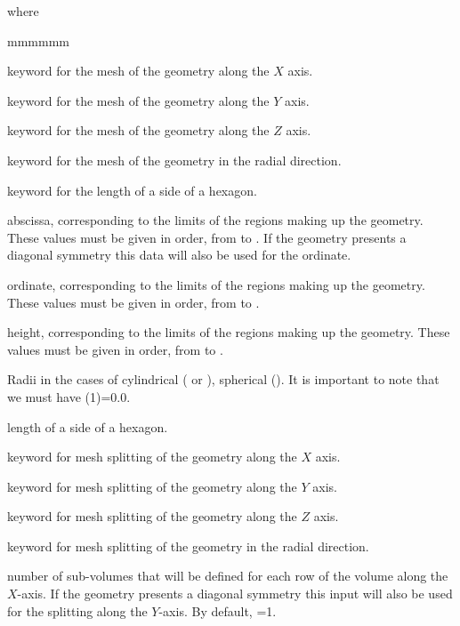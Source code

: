 \noindent where
\begin{ListeDeDescription}{mmmmmm}

\item[\moc{MESHX}] keyword for the mesh of the geometry along the $X$
axis.
\item[\moc{MESHY}] keyword for the mesh of the geometry along the $Y$
axis. 
\item[\moc{MESHZ}] keyword for the mesh of the geometry along the $Z$
axis. 
\item[\moc{RADIUS}] keyword for the mesh of the geometry in the radial
direction.
\item[\moc{SIDE}] keyword for the length of a side of a hexagon.
\item[\dusa{xxx}] abscissa, corresponding to the limits of the regions making up the geometry. These values must be given in order, from  to . If the geometry presents a diagonal symmetry this data will also be used for the ordinate.

\item[\dusa{yyy}] ordinate, corresponding to the limits of the regions making up the geometry. These values must be given in order, from  to .

\item[\dusa{zzz}] height, corresponding to the limits of the regions making up the geometry. These values must be given in order, from  to .

\item[\dusa{rrr}] Radii in the cases of cylindrical (
or ), spherical (). It is important to note that we must have (1)=0.0.

\item[\dusa{sidhex}] length of a side of a hexagon.

\item[\moc{SPLITX}] keyword for mesh splitting of the geometry along the $X$ axis.

\item[\moc{SPLITY}] keyword for mesh splitting of the geometry along the $Y$ axis.

\item[\moc{SPLITZ}] keyword for mesh splitting of the geometry along the $Z$ axis.

\item[\moc{SPLITR}] keyword for mesh splitting of the geometry in the radial direction.

\item[\dusa{ispltx}] number of sub-volumes that will be defined for each row of the volume along the $X$-axis. If the geometry presents a diagonal symmetry this input will also be used for the splitting along the $Y$-axis. By default, =1.


\end{ListeDeDescription}
